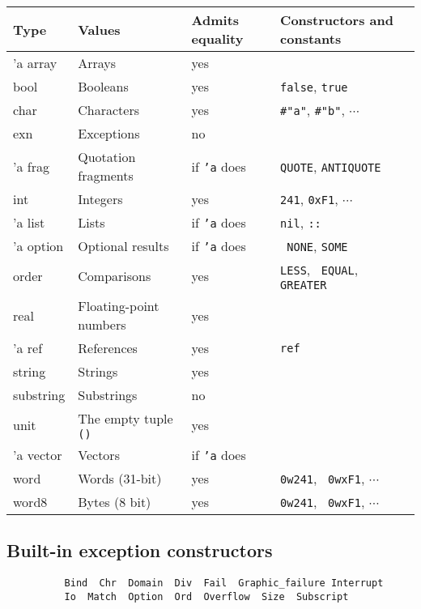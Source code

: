 \documentclass[fleqn]{article}
\begin{document}
\begin{tabular}{@{\tt\ \ }llll}\hline

{\rm Type} & Values & Admits equality & Constructors and constants\\\hline
'a array    & Arrays                  &  yes \\
bool        & Booleans                &  yes  & {\tt false}, {\tt true}\\
char        & Characters              &  yes & \verb$#"a"$,
    \verb$#"b"$, $\cdots$\\ 
exn         & Exceptions              &  no\\
'a frag     & Quotation fragments     &  if {\tt 'a} does 
& {\tt QUOTE}, {\tt ANTIQUOTE}\\
int         & Integers                & yes & {\tt 241}, {\tt 0xF1}, $\cdots$\\
'a list     & Lists                   &  if {\tt 'a} does & {\tt nil},
    {\tt ::}\\ 
'a option   & Optional results        &  if {\tt 'a} does & {\tt
  NONE}, {\tt SOME}\\ 
order       & Comparisons  &  yes  & {\tt LESS}, {\tt
  EQUAL}, {\tt GREATER}\\
real        & Floating-point numbers  &  yes\\
'a ref      & References              &  yes            & {\tt ref}\\
string      & Strings                 &  yes\\
substring   & Substrings              &  no\\
unit        & The empty tuple {\tt ()}    & yes \\
'a vector   & Vectors                 &  if {\tt 'a} does \\
word        & Words (31-bit)          &  yes & {\tt 0w241}, {\tt
  0wxF1}, $\cdots$ \\
word8       & Bytes (8 bit)           &  yes & {\tt 0w241}, {\tt
  0wxF1}, $\cdots$ \\\hline 
\end{tabular}


\subsection*{Built-in exception constructors}

\begin{verbatim}
          Bind  Chr  Domain  Div  Fail  Graphic_failure Interrupt  
          Io  Match  Option  Ord  Overflow  Size  Subscript  
\end{verbatim}
\end{document}
